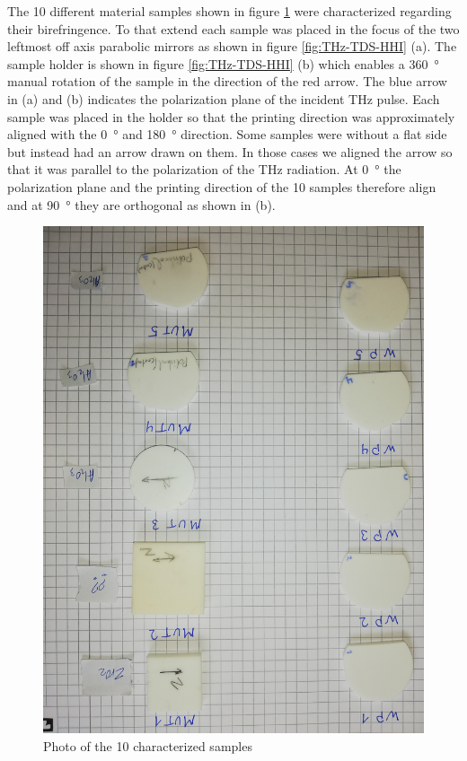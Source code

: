 The 10 different material samples shown in figure \ref{fig:ceramic_samples} were characterized regarding their birefringence. To that extend each sample was placed in the focus of the two leftmost off axis parabolic mirrors as shown in figure \ref{fig:THz-TDS-HHI} (a). The sample holder is shown in figure \ref{fig:THz-TDS-HHI} (b) which enables a \SI{360}{\degree} manual rotation of the sample in the direction of the red arrow. The blue arrow in (a) and (b) indicates the polarization plane of the incident THz pulse. Each sample was placed in the holder so that the printing direction was approximately aligned with the \SI{0}{\degree} and \SI{180}{\degree} direction. Some samples were without a flat side but instead had an arrow drawn on them. In those cases we aligned the arrow so that it was parallel to the polarization of the THz radiation. At \SI{0}{\degree} the polarization plane and the printing direction of the 10 samples therefore align and at \SI{90}{\degree} they are orthogonal as shown in (b). 

\begin{figure}
    \centering
    \includegraphics[scale=0.1,angle=180,origin=c]{images/appendix/ceramic_samples.jpg}
    \caption{Photo of the 10 characterized samples}
    \label{fig:ceramic_samples}
\end{figure}

